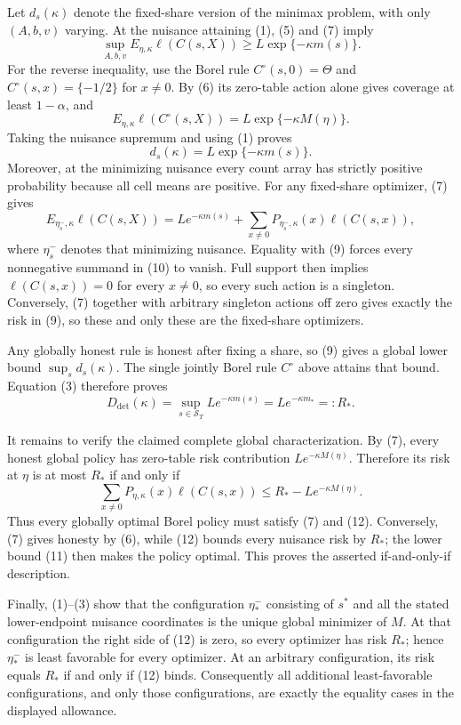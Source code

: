 Let \(d_s(\kappa)\) denote the fixed-share version of the minimax problem, with only \((A,b,v)\) varying.  At the nuisance attaining (1), (5) and (7) imply
\[
 \sup_{A,b,v}E_{\eta,\kappa}\ell(C(s,X))
 \ge L\exp\{-\kappa m(s)\}.
\tag{8}
\]
For the reverse inequality, use the Borel rule \(C^\circ(s,0)=\Theta\) and \(C^\circ(s,x)=\{-1/2\}\) for \(x\ne0\).  By (6) its zero-table action alone gives coverage at least \(1-\alpha\), and
\[
 E_{\eta,\kappa}\ell(C^\circ(s,X))
 =L\exp\{-\kappa M(\eta)\}.
\]
Taking the nuisance supremum and using (1) proves
\[
 d_s(\kappa)=L\exp\{-\kappa m(s)\}.
\tag{9}
\]
Moreover, at the minimizing nuisance every count array has strictly positive probability because all cell means are positive.  For any fixed-share optimizer, (7) gives
\[
 E_{\eta_s^-,\kappa}\ell(C(s,X))
 =L e^{-\kappa m(s)}+
   \sum_{x\ne0}P_{\eta_s^-,\kappa}(x)\ell(C(s,x)),
\tag{10}
\]
where \(\eta_s^-\) denotes that minimizing nuisance.  Equality with (9) forces every nonnegative summand in (10) to vanish.  Full support then implies \(\ell(C(s,x))=0\) for every \(x\ne0\), so every such action is a singleton.  Conversely, (7) together with arbitrary singleton actions off zero gives exactly the risk in (9), so these and only these are the fixed-share optimizers.

Any globally honest rule is honest after fixing a share, so (9) gives a global lower bound \(\sup_s d_s(\kappa)\).  The single jointly Borel rule \(C^\circ\) above attains that bound.  Equation (3) therefore proves
\[
 D_{\mathrm{det}}(\kappa)
 =\sup_{s\in\mathcal S_T}L e^{-\kappa m(s)}
 =L e^{-\kappa m_*}=:R_*.
\tag{11}
\]

It remains to verify the claimed complete global characterization.  By (7), every honest global policy has zero-table risk contribution \(L e^{-\kappa M(\eta)}\).  Therefore its risk at \(\eta\) is at most \(R_*\) if and only if
\[
 \sum_{x\ne0}P_{\eta,\kappa}(x)\ell(C(s,x))
 \le R_*-L e^{-\kappa M(\eta)}.
\tag{12}
\]
Thus every globally optimal Borel policy must satisfy (7) and (12).  Conversely, (7) gives honesty by (6), while (12) bounds every nuisance risk by \(R_*\); the lower bound (11) then makes the policy optimal.  This proves the asserted if-and-only-if description.

Finally, (1)--(3) show that the configuration \(\eta_*^-\) consisting of \(s^*\) and all the stated lower-endpoint nuisance coordinates is the unique global minimizer of \(M\).  At that configuration the right side of (12) is zero, so every optimizer has risk \(R_*\); hence \(\eta_*^-\) is least favorable for every optimizer.  At an arbitrary configuration, its risk equals \(R_*\) if and only if (12) binds.  Consequently all additional least-favorable configurations, and only those configurations, are exactly the equality cases in the displayed allowance.

